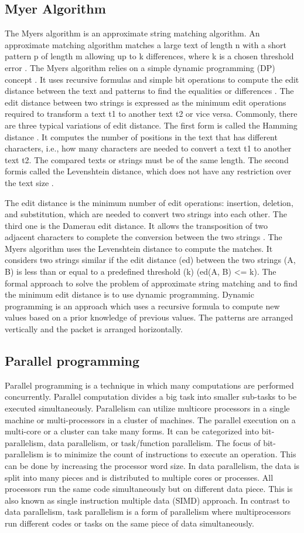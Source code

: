 \documentclass[12pt,a4paper]{report}
\begin{document}
\subsection{Myer Algorithm}
The Myers algorithm is an approximate string matching algorithm. An approximate matching algorithm matches a large text of length n with a short pattern p of length m
allowing up to k differences, where k is a chosen threshold
error . The Myers algorithm relies on a simple
dynamic programming (DP) concept . It uses recursive
formulas and simple bit operations to compute the
edit distance between the text and patterns to find the
equalities or differences . The edit distance between
two strings is expressed as the minimum edit operations
required to transform a text t1 to another text t2 or vice
versa. Commonly, there are three typical variations of
edit distance. The first form is called the Hamming distance
. It computes the number of positions in the
text that has different characters, i.e., how many characters
are needed to convert a text t1 to another text t2.
The compared texts or strings must be of the same length.
The second formis called the Levenshtein distance, which
does not have any restriction over the text size .

The edit distance is the minimum number of edit operations:
insertion, deletion, and substitution, which are needed to
convert two strings into each other. The third one is the
Damerau edit distance. It allows the transposition of two
adjacent characters to complete the conversion between
the two strings . The Myers algorithm uses the Levenshtein distance to compute the matches. It considers two strings similar if the edit distance (ed) between the two strings (A, B)
is less than or equal to a predefined threshold (k) (ed(A, B) <= k).
The formal approach to solve the problem of approximate
string matching and to find the minimum edit
distance is to use dynamic programming. Dynamic programming
is an approach which uses a recursive formula
to compute new values based on a prior knowledge of previous
values. The patterns
are arranged vertically and the packet is arranged horizontally.
\subsection{Parallel programming}
Parallel programming is a technique in which many computations
are performed concurrently. Parallel computation
divides a big task into smaller sub-tasks to be
executed simultaneously. Parallelism can utilize multicore
processors in a single machine or multi-processors in
a cluster of machines.
The parallel execution on a multi-core or a cluster
can take many forms. It can be categorized into
bit-parallelism, data parallelism, or task/function parallelism.
The focus of bit-parallelism is to minimize
the count of instructions to execute an operation. This
can be done by increasing the processor word size.
In data parallelism, the data is split into many pieces and
is distributed to multiple cores or processes. All processors
run the same code simultaneously but on different
data piece. This is also known as single instruction multiple
data (SIMD) approach. In contrast to data parallelism,
task parallelism is a form of parallelism where multiprocessors
run different codes or tasks on the same piece
of data simultaneously.
\end{document}
